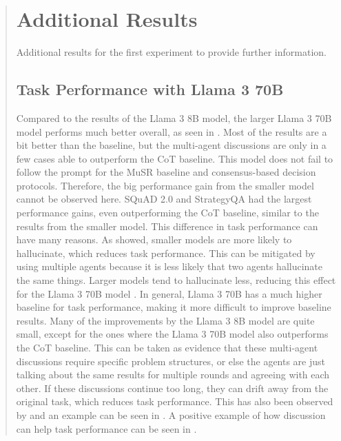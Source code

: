 \documentclass[11pt]{article}
\begin{document}
\begin{abstract}
\section{Additional Results}

Additional results for the first experiment to provide further information.
\subsection{Task Performance with Llama 3 70B}
\label{app:decision_70b}

Compared to the results of the Llama 3 8B model, the larger Llama 3 70B model performs much better overall, as seen in . Most of the results are a bit better than the baseline, but the multi-agent discussions are only in a few cases able to outperform the \ac{CoT} baseline. This model does not fail to follow the prompt for the MuSR baseline and consensus-based decision protocols. Therefore, the big performance gain from the smaller model cannot be observed here. SQuAD 2.0 and StrategyQA had the largest performance gains, even outperforming the \ac{CoT} baseline, similar to the results from the smaller model. This difference in task performance can have many reasons. As \citet{li_dawn_2024} showed, smaller models are more likely to hallucinate, which reduces task performance. This can be mitigated by using multiple agents because it is less likely that two agents hallucinate the same things. Larger models tend to hallucinate less, reducing this effect for the Llama 3 70B model \citep{li_dawn_2024}. In general, Llama 3 70B has a much higher baseline for task performance, making it more difficult to improve baseline results. Many of the improvements by the Llama 3 8B model are quite small, except for the ones where the Llama 3 70B model also outperforms the \ac{CoT} baseline. This can be taken as evidence that these multi-agent discussions require specific problem structures, or else the agents are just talking about the same results for multiple rounds and agreeing with each other. If these discussions continue too long, they can drift away from the original task, which reduces task performance. This has also been observed by \citet{becker_multi-agent_2024} and an example can be seen in . A positive example of how discussion can help task performance can be seen in .


\end{abstract}
\end{document}
